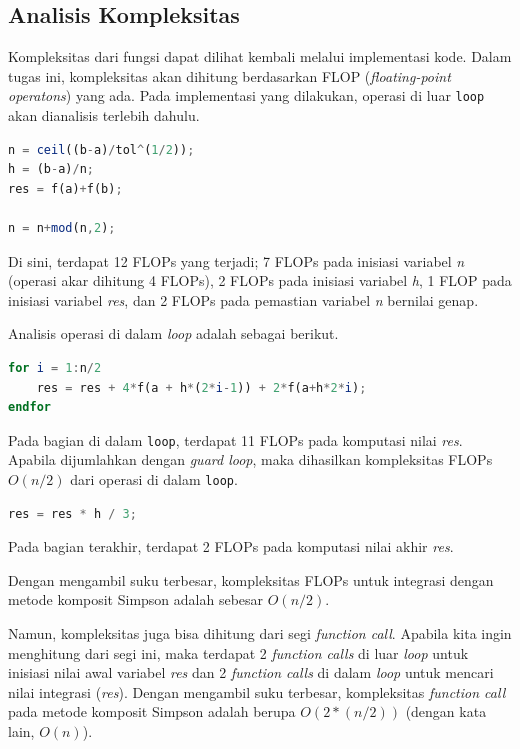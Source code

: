 \documentclass[journal,12pt,onecolumn,a4paper]{IEEEtran}
\begin{document}
\subsection{Analisis Kompleksitas}
Kompleksitas dari fungsi dapat dilihat kembali melalui implementasi kode. Dalam tugas ini, kompleksitas akan dihitung berdasarkan FLOP (\emph{floating-point operatons}) yang ada.
Pada implementasi yang dilakukan, operasi di luar \lstinline{loop} akan dianalisis terlebih dahulu.
\begin{center}
	\begin{lstlisting}[language=Octave]
n = ceil((b-a)/tol^(1/2));
h = (b-a)/n;
res = f(a)+f(b);
	  
n = n+mod(n,2);
	\end{lstlisting}
\end{center}

Di sini, terdapat 12 FLOPs yang terjadi; 7 FLOPs pada inisiasi variabel \emph{n} (operasi akar dihitung 4 FLOPs), 2 FLOPs pada inisiasi variabel \emph{h}, 1 FLOP pada inisiasi variabel \emph{res}, dan 2 FLOPs pada pemastian variabel \emph{n} bernilai genap.

Analisis operasi di dalam \emph{loop} adalah sebagai berikut.
\begin{center}
	\begin{lstlisting}[language=Octave]
for i = 1:n/2
	res = res + 4*f(a + h*(2*i-1)) + 2*f(a+h*2*i);
endfor
	\end{lstlisting}
\end{center}

\par Pada bagian di dalam \lstinline{loop}, terdapat 11 FLOPs pada komputasi nilai \emph{res}. Apabila dijumlahkan dengan \emph{guard loop}, maka dihasilkan kompleksitas FLOPs \(O(n/2)\) dari operasi di dalam \lstinline{loop}.

\begin{center}
	\begin{lstlisting}[language=Octave]
res = res * h / 3;
	\end{lstlisting}
\end{center}

Pada bagian terakhir, terdapat 2 FLOPs pada komputasi nilai akhir \emph{res}.

Dengan mengambil suku terbesar, kompleksitas FLOPs untuk integrasi dengan metode komposit Simpson adalah sebesar \(O(n/2)\).


Namun, kompleksitas juga bisa dihitung dari segi \emph{function call}. Apabila kita ingin menghitung dari segi ini, maka terdapat 2 \emph{function calls} di luar \emph{loop} untuk inisiasi nilai awal variabel \emph{res} dan 2 \emph{function calls} di dalam \emph{loop} untuk mencari nilai integrasi (\emph{res}). Dengan mengambil suku terbesar, kompleksitas \emph{function call} pada metode komposit Simpson adalah berupa \(O(2*(n/2))\) (dengan kata lain, \(O(n)\)).
\end{document}
